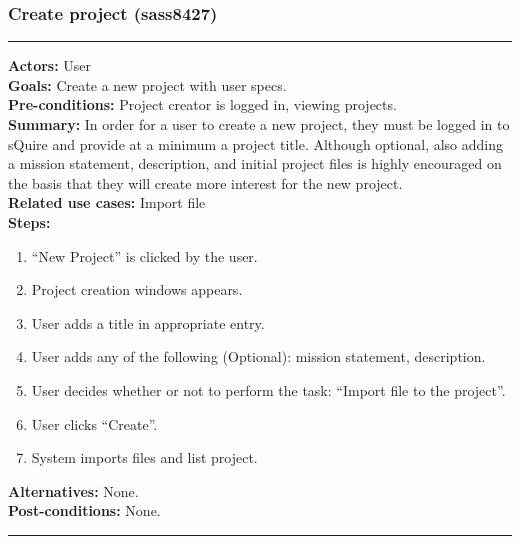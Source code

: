 \documentclass[11pt]{report}
\begin{document}
\subsubsection{Create project (sass8427)}
\vspace{2pt}
\hrule
\vspace{8pt}
 \textbf{Actors:} User \\ 
 \textbf{Goals:} Create a new project with user specs. \\
 \textbf{Pre-conditions:} Project creator is logged in, viewing projects.  \\
\textbf{Summary:} In order for a user to create a new project, they must be logged in to sQuire and provide at a minimum a project title. Although optional, also adding a mission statement, description, and initial project files is highly encouraged on the basis that they will create more interest for the new project. \\ 
 \textbf{Related use cases:} Import file \\ 
 \textbf{Steps:} \begin{enumerate}
  \item ``New Project'' is clicked by the user.
  \item Project creation windows appears. 
  \item User adds a title in appropriate entry. 
  \item User adds any of the following (Optional): mission statement, description.
  \item User decides whether or not to perform the task: ``Import file to the project''.
  \item User clicks ``Create''.
  \item System imports files and list project.
 \end{enumerate}
 \textbf{Alternatives:} None. \\
 \textbf{Post-conditions:} None. \\
 \vspace{8pt}
\hrule
\newpage
\end{document}
